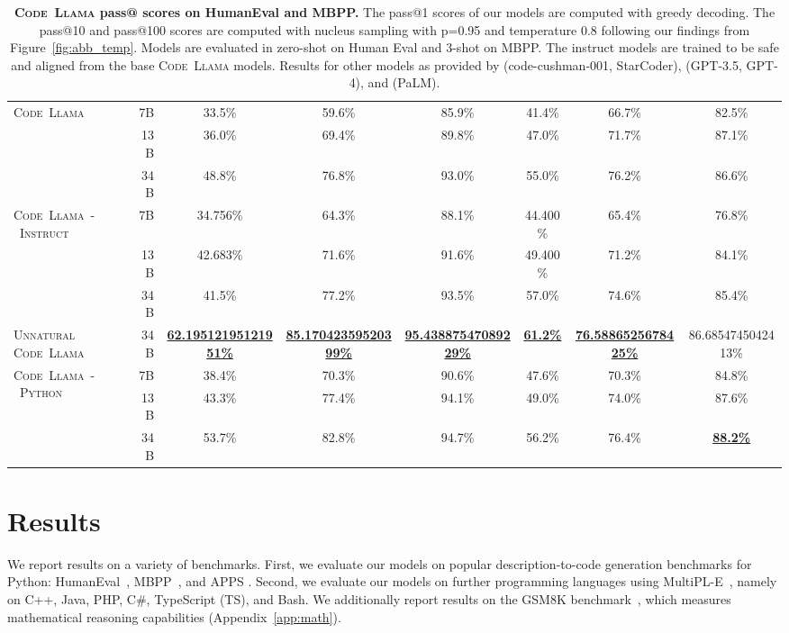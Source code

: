 \documentclass[10pt]{article}
\newcommand{\model}{\textsc{Code~Llama}\xspace}
\newcommand{\instmodel}{\textsc{Code~Llama~-~Instruct}\xspace}
\newcommand{\pymodel}{\textsc{Code~Llama~-~Python}\xspace}
\newcommand*{\acc}[1]{\num[round-mode=places,round-precision=1]{#1}\%}
\begin{document}
\begin{table}[t!]
\begin{tabular}{lr|ccc|ccc}
  \midrule
  \multirow{ 3}{*}{\model} &7B  & \acc{33.5}  & \acc{59.6}& \acc{85.9} & \acc{41.4}&\acc{66.7} & \acc{82.5}\\
  &13B  & \acc{36.0}  &\acc{69.4} & \acc{89.8} & \acc{47.0} &\acc{71.7}& \acc{87.1}\\
  &34B  & \acc{48.8}  &\acc{76.8} & \acc{93.0}& \acc{55.0}&\acc{76.2}& \acc{86.6}\\
  \midrule
  \multirow{ 3}{*}{\instmodel} &7B  &\acc{34.756}  & \acc{64.3} & \acc{88.1} & \acc{44.400}&\acc{65.4}&  \acc{76.8}\\
  &13B  & \acc{42.683} & \acc{71.6} & \acc{91.6} & \acc{49.400} &\acc{71.2}&  \acc{84.1}\\
  &34B  &  \acc{41.5}& \acc{77.2} & \acc{93.5} & \acc{57.0} &\acc{74.6}& \acc{85.4}\\
  \textsc{Unnatural} \model &34B & \bf{\underline{\acc{62.19512195121951}}} & \bf{\underline{\acc{85.17042359520399}}}& \bf{\underline{\acc{95.43887547089229}}}&\bf{\underline{\acc{61.2}}}&\bf{\underline{\acc{76.5886525678425}}}&\acc{86.6854745042413}\\
  \midrule
\multirow{ 3}{*}{\pymodel}& 7B  & \acc{38.4}  &\acc{70.3} & \acc{90.6}& \acc{47.6}&\acc{70.3}&\acc{84.8}\\
  &13B  & \acc{43.3}  &\acc{77.4} & \acc{94.1}& \acc{49.0}&\acc{74.0}&\acc{87.6}\\
  &34B  & \acc{53.7}  & \acc{82.8}& \acc{94.7}& \acc{56.2}&\acc{76.4}&\bf{\underline{\acc{88.2}}}\\
  \bottomrule
  \end{tabular}
  \caption{\textbf{\model pass@ scores on HumanEval and MBPP.} 
The pass@1 scores of our models are computed with greedy decoding. The pass@10 and pass@100 scores are computed with nucleus sampling with p=0.95 and temperature 0.8 following our findings from Figure~\ref{fig:abb_temp}. 
  Models are evaluated in zero-shot on Human Eval and 3-shot on MBPP. 
  The instruct models are trained to be safe and aligned from the base \model models.
  Results for other models as provided by \citet{li2023starcoder} (code-cushman-001, StarCoder), \citet{openai2023gpt4} (GPT-3.5, GPT-4), and \citet{chowdhery2022palm,anil2023palm} (PaLM).
  \label{tab:main_res}}
\end{table}

\section{Results}\label{sec:results}
We report results on a variety of benchmarks. First, we evaluate our models on popular description-to-code generation benchmarks for Python: HumanEval~\citep{chen2021evaluating},  MBPP~\citep{austin2021program}, and APPS \citep[programming interviews and competitions,][]{hendrycks2021measuring}. Second, we evaluate our models on further programming languages using MultiPL-E~\citep{cassano2022multiple}, namely on C++, Java, PHP, C\#, TypeScript (TS), and Bash. We additionally report results on the GSM8K benchmark~\citep{cobbe2021training}, which measures mathematical reasoning capabilities (Appendix~\ref{app:math}).
\end{document}
